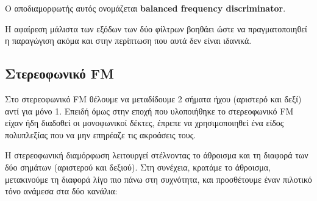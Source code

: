 \documentclass[11pt,a4paper,notitlepage,fleqn,final]{article}
\begin{document}

Ο αποδιαμορφωτής αυτός ονομάζεται \textbf{balanced frequency discriminator}.

Η αφαίρεση μάλιστα των εξόδων των δύο φίλτρων βοηθάει ώστε να πραγματοποιηθεί η παραγώγιση
ακόμα και στην περίπτωση που αυτά δεν είναι ιδανικά.

\subsection{Στερεοφωνικό FM}
Στο στερεοφωνικό FM θέλουμε να μεταδίδουμε 2 σήματα ήχου (αριστερό και δεξί) αντί για μόνο 1.
Επειδή όμως στην εποχή που υλοποιήθηκε το στερεοφωνικό FM είχαν ήδη διαδοθεί οι μονοφωνικοί
δέκτες, έπρεπε να χρησιμοποιηθεί ένα είδος πολυπλεξίας που να μην επηρέαζε τις ακροάσεις τους.

Η στερεοφωνική διαμόρφωση λειτουργεί στέλνοντας το άθροισμα και τη διαφορά των δύο σημάτων
(αριστερού και δεξιού). Στη συνέχεια, κρατάμε το άθροισμα, μετακινούμε τη διαφορά λίγο
πιο πάνω στη συχνότητα, και προσθέτουμε έναν πιλοτικό τόνο ανάμεσα στα δύο κανάλια:
\end{document}

